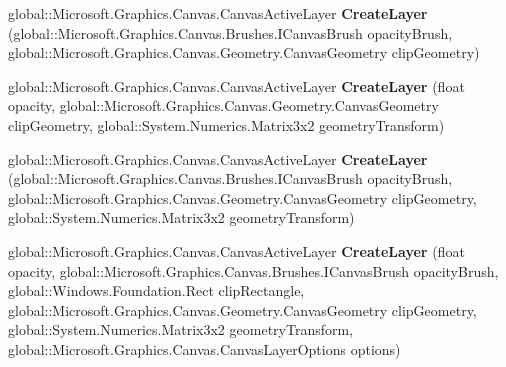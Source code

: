 \begin{DoxyCompactItemize}
\item 
\mbox{\label{class_microsoft_1_1_graphics_1_1_canvas_1_1_canvas_drawing_session_aec4cd7b8de61e6dff683f423ccfd6416}} 
global\+::\+Microsoft.\+Graphics.\+Canvas.\+Canvas\+Active\+Layer {\bfseries Create\+Layer} (global\+::\+Microsoft.\+Graphics.\+Canvas.\+Brushes.\+I\+Canvas\+Brush opacity\+Brush, global\+::\+Microsoft.\+Graphics.\+Canvas.\+Geometry.\+Canvas\+Geometry clip\+Geometry)
\item 
\mbox{\label{class_microsoft_1_1_graphics_1_1_canvas_1_1_canvas_drawing_session_aad550ec89902ec08b4795f1dde974974}} 
global\+::\+Microsoft.\+Graphics.\+Canvas.\+Canvas\+Active\+Layer {\bfseries Create\+Layer} (float opacity, global\+::\+Microsoft.\+Graphics.\+Canvas.\+Geometry.\+Canvas\+Geometry clip\+Geometry, global\+::\+System.\+Numerics.\+Matrix3x2 geometry\+Transform)
\item 
\mbox{\label{class_microsoft_1_1_graphics_1_1_canvas_1_1_canvas_drawing_session_a0246890930306af273c44a895afe6451}} 
global\+::\+Microsoft.\+Graphics.\+Canvas.\+Canvas\+Active\+Layer {\bfseries Create\+Layer} (global\+::\+Microsoft.\+Graphics.\+Canvas.\+Brushes.\+I\+Canvas\+Brush opacity\+Brush, global\+::\+Microsoft.\+Graphics.\+Canvas.\+Geometry.\+Canvas\+Geometry clip\+Geometry, global\+::\+System.\+Numerics.\+Matrix3x2 geometry\+Transform)
\item 
\mbox{\label{class_microsoft_1_1_graphics_1_1_canvas_1_1_canvas_drawing_session_a6062b1492a1896c35d87eca2a7342314}} 
global\+::\+Microsoft.\+Graphics.\+Canvas.\+Canvas\+Active\+Layer {\bfseries Create\+Layer} (float opacity, global\+::\+Microsoft.\+Graphics.\+Canvas.\+Brushes.\+I\+Canvas\+Brush opacity\+Brush, global\+::\+Windows.\+Foundation.\+Rect clip\+Rectangle, global\+::\+Microsoft.\+Graphics.\+Canvas.\+Geometry.\+Canvas\+Geometry clip\+Geometry, global\+::\+System.\+Numerics.\+Matrix3x2 geometry\+Transform, global\+::\+Microsoft.\+Graphics.\+Canvas.\+Canvas\+Layer\+Options options)
\item 
\mbox{\label{class_microsoft_1_1_graphics_1_1_canvas_1_1_canvas_drawing_session_a0fe73a40837cfd7827de146984527959}} 

\end{DoxyCompactItemize}
